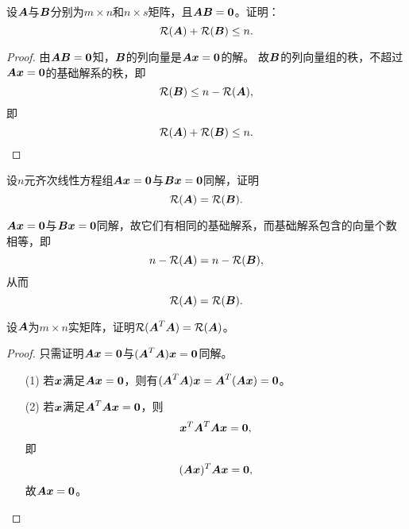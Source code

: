 \begin{frame}
\begin{li}
  设$\boldsymbol{A}$与$\boldsymbol{B}$分别为$m\times n$和$n\times s$矩阵，且$\MA\MB=\M0$。证明：
  $$
  \mathcal{R}(\boldsymbol{A})+\mathcal{R}(\boldsymbol{B})\le n.
  $$
\end{li}
\pause 
\begin{proof}
由$\MA\MB=\M0$知，$\boldsymbol{B}$的列向量是$\MA\vx=\M0$的解。
故$\boldsymbol{B}$的列向量组的秩，不超过$\MA\vx=\M0$的基础解系的秩，即
$$
\mathcal{R}(\boldsymbol{B}) \le n-\mathcal{R}(\boldsymbol{A}),
$$
即
$$
\mathcal{R}(\boldsymbol{A})+\mathcal{R}(\boldsymbol{B})\le n.
$$
\end{proof}
\end{frame}

\begin{frame}

\begin{li}
  设$n$元齐次线性方程组$\MA\vx=\M0$与$\MB\vx=\M0$同解，证明
  $$
  \mathcal{R}(\boldsymbol{A})=\mathcal{R}(\boldsymbol{B}).
  $$
\end{li}
\pause 
\begin{jie}
$\MA\vx=\M0$与$\MB\vx=\M0$同解，故它们有相同的基础解系，而基础解系包含的向量个数相等，即
$$
n-\mathcal{R}(\boldsymbol{A})=n-\mathcal{R}(\boldsymbol{B}),
$$
从而
$$
\mathcal{R}(\boldsymbol{A})=\mathcal{R}(\boldsymbol{B}).
$$
\end{jie}
\end{frame}


\begin{frame}
\begin{li}
  设$\boldsymbol{A}$为$m\times n$实矩阵，证明$\mathcal{R}(\boldsymbol{A}^T\boldsymbol{A})=\mathcal{R}(\boldsymbol{A})$。    
\end{li}
\pause 
\begin{proof}
只需证明$\MA\vx=\M0$与$(\MA^T\MA)\vx=\M0$同解。
\begin{itemize}
\item[(1)] 若${\boldsymbol{x}}$满足$\MA\vx=\M0$，则有$(\MA^T\MA)\vx=\MA^T(\MA\vx)=\M0$。 
\item[(2)] 若${\boldsymbol{x}}$满足$\MA^T\MA\vx=\M0$，则
  $$
  \vx^T\MA^T\MA\vx=\M0,
  $$
  即
  $$
  (\MA\vx)^T\MA\vx=\M0,
  $$
  故$\MA\vx=\M0$。
\end{itemize}
\end{proof}
\end{frame}

